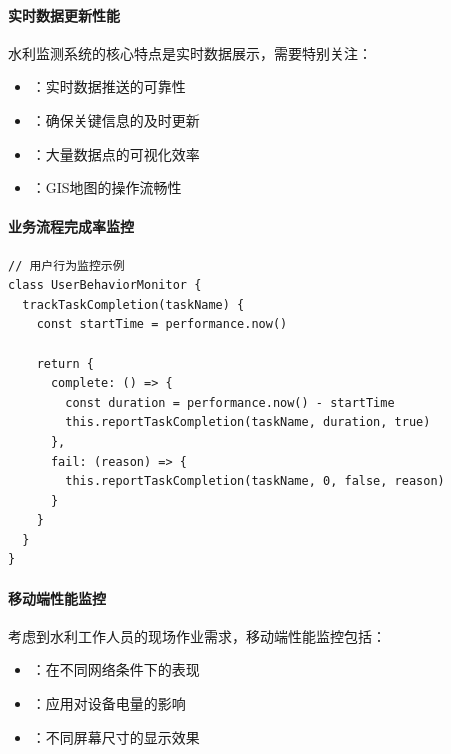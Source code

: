 \hypertarget{ux5b9eux65f6ux6570ux636eux66f4ux65b0ux6027ux80fd}{%
\paragraph{实时数据更新性能}\label{ux5b9eux65f6ux6570ux636eux66f4ux65b0ux6027ux80fd}}

水利监测系统的核心特点是实时数据展示，需要特别关注：

\begin{itemize}
\tightlist
\item
  ：实时数据推送的可靠性
\item
  ：确保关键信息的及时更新
\item
  ：大量数据点的可视化效率
\item
  ：GIS地图的操作流畅性
\end{itemize}

\hypertarget{ux4e1aux52a1ux6d41ux7a0bux5b8cux6210ux7387ux76d1ux63a7}{%
\paragraph{业务流程完成率监控}\label{ux4e1aux52a1ux6d41ux7a0bux5b8cux6210ux7387ux76d1ux63a7}}

\begin{lstlisting}[style=javascript]
// 用户行为监控示例
class UserBehaviorMonitor {
  trackTaskCompletion(taskName) {
    const startTime = performance.now()
    
    return {
      complete: () => {
        const duration = performance.now() - startTime
        this.reportTaskCompletion(taskName, duration, true)
      },
      fail: (reason) => {
        this.reportTaskCompletion(taskName, 0, false, reason)
      }
    }
  }
}
\end{lstlisting}

\hypertarget{ux79fbux52a8ux7aefux6027ux80fdux76d1ux63a7}{%
\paragraph{移动端性能监控}\label{ux79fbux52a8ux7aefux6027ux80fdux76d1ux63a7}}

考虑到水利工作人员的现场作业需求，移动端性能监控包括：

\begin{itemize}
\tightlist
\item
  ：在不同网络条件下的表现
\item
  ：应用对设备电量的影响
\item
  ：不同屏幕尺寸的显示效果
\end{itemize}

